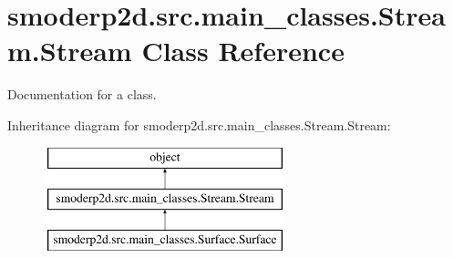 \hypertarget{classsmoderp2d_1_1src_1_1main__classes_1_1Stream_1_1Stream}{\section{smoderp2d.\-src.\-main\-\_\-classes.\-Stream.\-Stream Class Reference}
\label{classsmoderp2d_1_1src_1_1main__classes_1_1Stream_1_1Stream}
}


Documentation for a class.  


Inheritance diagram for smoderp2d.\-src.\-main\-\_\-classes.\-Stream.\-Stream\-:\begin{figure}[H]
\begin{center}
\leavevmode
\includegraphics[height=3.000000cm]{classsmoderp2d_1_1src_1_1main__classes_1_1Stream_1_1Stream}
\end{center}
\end{figure}
